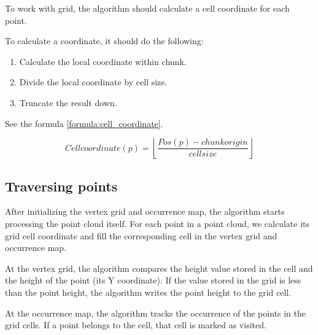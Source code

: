 To work with grid, the algorithm should calculate a cell coordinate for each point.

To calculate a coordinate, it should do the following:
\begin{enumerate}
    \item Calculate the local coordinate within chunk.
    \item Divide the local coordinate by cell size.
    \item Truncate the result down.
\end{enumerate}

See the formula \ref{formula:cell_coordinate}.

\begin{equation}
\label{formula:cell_coordinate}
Cell coordinate(p) = \left \lfloor \frac{Pos(p) - chunk origin}{cell size} \right \rfloor
\end{equation}


\subsection{Traversing points}
\label{subsec:traversing_points}

After initializing the vertex grid and occurrence map, the algorithm starts processing the point cloud itself.
For each point in a point cloud, we calculate its grid cell coordinate and fill the corresponding cell in the vertex grid and occurrence map.

At the vertex grid, the algorithm compares the height value stored in the cell and the height of the point (its Y coordinate). If the value stored in the grid is less than the point height, the algorithm writes the point height to the grid cell.

At the occurrence map, the algorithm tracks the occurrence of the points in the grid cells. If a point belongs to the cell, that cell is marked as visited.

\begin{algorithm}
\end{algorithm}
